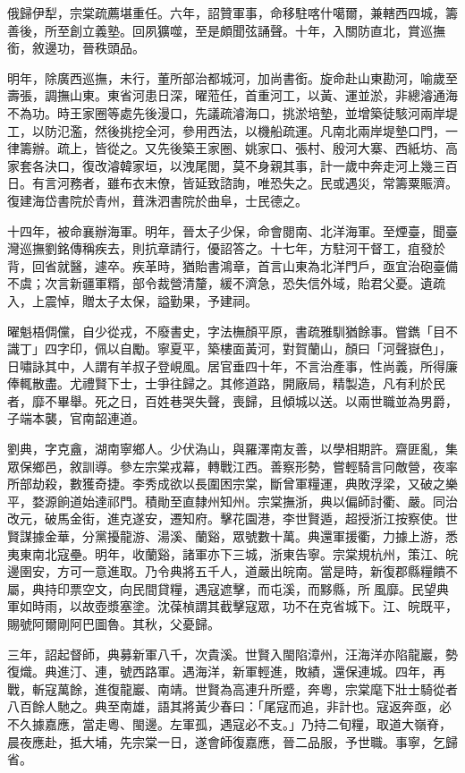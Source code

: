 \begin{pinyinscope}
俄歸伊犁，宗棠疏薦堪重任。六年，詔贊軍事，命移駐喀什噶爾，兼轄西四城，籌善後，所至創立義塾。回夙獷噬，至是頗聞弦誦聲。十年，入關防直北，賞巡撫銜，敘邊功，晉秩頭品。

明年，除廣西巡撫，未行，董所部治都城河，加尚書銜。旋命赴山東勘河，喻歲至壽張，調撫山東。東省河患日深，曜蒞任，首重河工，以黃、運並淤，非總濬通海不為功。時王家圈等處先後漫口，先議疏濬海口，挑淤培墊，並增築徒駭河兩岸堤工，以防氾濫，然後挑挖全河，參用西法，以機船疏運。凡南北兩岸堤墊口門，一律籌辦。疏上，皆從之。又先後築王家圈、姚家口、張村、殷河大寨、西紙坊、高家套各決口，復改濬韓家垣，以洩尾閭，莫不身親其事，計一歲中奔走河上幾三百日。有言河務者，雖布衣末僚，皆延致諮詢，唯恐失之。民或遇災，常籌粟賑濟。復建海岱書院於青州，葺洙泗書院於曲阜，士民德之。

十四年，被命襄辦海軍。明年，晉太子少保，命會閱南、北洋海軍。至煙臺，聞臺灣巡撫劉銘傳稱疾去，則抗章請行，優詔答之。十七年，方駐河干督工，疽發於背，回省就醫，遽卒。疾革時，猶貽書鴻章，首言山東為北洋門戶，亟宜治砲臺備不虞；次言新疆軍糈，部令裁營清釐，緩不濟急，恐失信外域，貽君父憂。遺疏入，上震悼，贈太子太保，謚勤果，予建祠。

曜魁梧倜儻，自少從戎，不廢書史，字法橅顏平原，書疏雅馴猶餘事。嘗鐫「目不識丁」四字印，佩以自勵。寧夏平，築樓面黃河，對賀蘭山，顏曰「河聲嶽色」，日嘯詠其中，人謂有羊叔子登峴風。居官垂四十年，不言治產事，性尚義，所得廉俸輒散盡。尤禮賢下士，士爭往歸之。其修道路，開廠局，精製造，凡有利於民者，靡不畢舉。死之日，百姓巷哭失聲，喪歸，且傾城以送。以兩世職並為男爵，子端本襲，官南韶連道。

劉典，字克盦，湖南寧鄉人。少伏溈山，與羅澤南友善，以學相期許。齋匪亂，集眾保鄉邑，敘訓導。參左宗棠戎幕，轉戰江西。善察形勢，嘗輕騎言冋敵營，夜率所部劫殺，數獲奇捷。李秀成欲以長圍困宗棠，斷曾軍糧運，典敗浮梁，又破之樂平，婺源餉道始達祁門。積勛至直隸州知州。宗棠撫浙，典以偏師討衢、嚴。同治改元，破馬金街，進克遂安，遷知府。擊花園港，李世賢遁，超授浙江按察使。世賢謀據金華，分黨擾龍游、湯溪、蘭谿，眾號數十萬。典還軍援衢，力據上游，悉夷東南北寇壘。明年，收蘭谿，諸軍亦下三城，浙東告寧。宗棠規杭州，策江、皖邊圉安，方可一意進取。乃令典將五千人，道嚴出皖南。當是時，新復郡縣糧饋不屬，典持印票空文，向民間貸糧，遇寇遮擊，而屯溪，而黟縣，所風靡。民望典軍如時雨，以故壺漿塞塗。沈葆楨謂其截擊寇眾，功不在克省城下。江、皖既平，賜號阿爾剛阿巴圖魯。其秋，父憂歸。

三年，詔起督師，典募新軍八千，次貴溪。世賢入閩陷漳州，汪海洋亦陷龍巖，勢復熾。典進汀、連，號西路軍。遇海洋，新軍輕進，敗績，還保連城。四年，再戰，斬寇萬餘，進復龍巖、南靖。世賢為高連升所蹙，奔粵，宗棠麾下壯士騎從者八百餘人馳之。典至南雄，語其將黃少春曰：「尾寇而追，非計也。寇返奔亟，必不久據嘉應，當走粵、閩邊。左軍孤，遇寇必不支。」乃持二旬糧，取道大嶺脊，晨夜應赴，抵大埔，先宗棠一日，遂會師復嘉應，晉二品服，予世職。事寧，乞歸省。


\end{pinyinscope}
